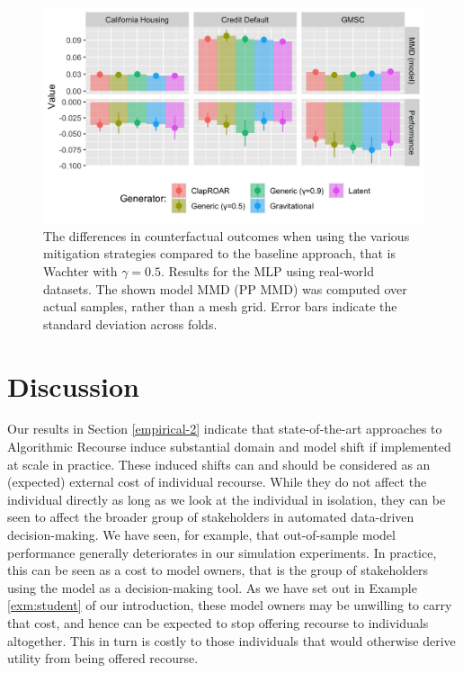 \documentclass[conference,final,]{IEEEtran}
\theoremstyle{definition}
\theoremstyle{definition}
\theoremstyle{definition}
\theoremstyle{definition}
\theoremstyle{remark}
\begin{document}
\begin{figure}

{\centering \includegraphics[width=0.9\linewidth]{www/mitigation_real_world_results} 

}

\caption{The differences in counterfactual outcomes when using the various mitigation strategies compared to the baseline approach, that is Wachter with $\gamma=0.5$. Results for the MLP using real-world datasets. The shown model MMD (PP MMD) was computed over actual samples, rather than a mesh grid. Error bars indicate the standard deviation across folds.}\label{fig:mitigate-real-world-results}
\end{figure}

\hypertarget{discussion}{%
\section{Discussion}\label{discussion}}

Our results in Section \ref{empirical-2} indicate that state-of-the-art approaches to Algorithmic Recourse induce substantial domain and model shift if implemented at scale in practice. These induced shifts can and should be considered as an (expected) external cost of individual recourse. While they do not affect the individual directly as long as we look at the individual in isolation, they can be seen to affect the broader group of stakeholders in automated data-driven decision-making. We have seen, for example, that out-of-sample model performance generally deteriorates in our simulation experiments. In practice, this can be seen as a cost to model owners, that is the group of stakeholders using the model as a decision-making tool. As we have set out in Example \ref{exm:student} of our introduction, these model owners may be unwilling to carry that cost, and hence can be expected to stop offering recourse to individuals altogether. This in turn is costly to those individuals that would otherwise derive utility from being offered recourse.
\end{document}
